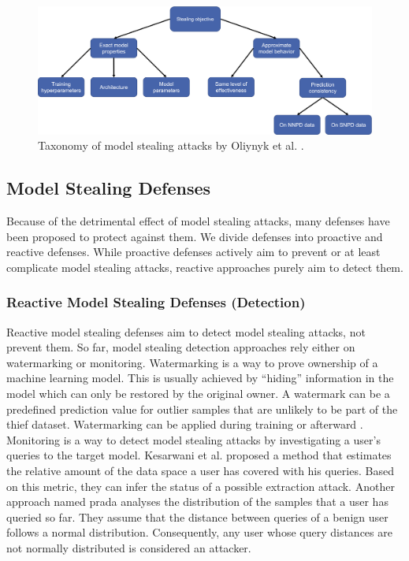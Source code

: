 \begin{figure} [ht]
  \centering
  \includegraphics[width=\linewidth]{images/MS_Taxonomy.png}
  \caption[Taxonomy of model stealing attacks]{Taxonomy of model stealing attacks by Oliynyk et al. \cite{oliynyk2022know}.}
  \label{fig:ModelStealing:Taxonomy}
\end{figure}


\subsection{Model Stealing Defenses}
\label{sec:ModelStealing:Defenses}
Because of the detrimental effect of model stealing attacks, many defenses have been proposed to protect against them. We divide defenses into proactive and
reactive defenses. While proactive defenses actively aim to prevent or at least complicate model stealing attacks, reactive approaches purely aim to detect them.

\subsubsection{Reactive Model Stealing Defenses (Detection)}
\label{sec:ModelStealing:Defenses:Detection}
Reactive model stealing defenses aim to detect model stealing attacks, not prevent them. So far, model stealing detection approaches
rely either on watermarking or monitoring. Watermarking is a way to prove ownership of a machine learning model. This is usually achieved by \enquote{hiding} information
in the model which can only be restored by the original owner. A watermark can be a predefined prediction value for outlier samples that are unlikely to be part of the
thief dataset. Watermarking can be applied during training \cite{zhang2018protecting} or afterward \cite{szyller2021dawn}. Monitoring is a way to detect model stealing
attacks by investigating a user's queries to the target model. Kesarwani et al. \cite{kesarwani2018model} proposed a method that estimates the relative amount of the
data space a user has covered with his queries. Based on this metric, they can infer the status of a possible extraction attack. Another approach named \gls{prada} 
\cite{juuti2019prada} analyses the distribution of the samples that a user has queried so far. They assume that the distance between queries of a benign user follows
a normal distribution. Consequently, any user whose query distances are not normally distributed is considered an attacker. \par

